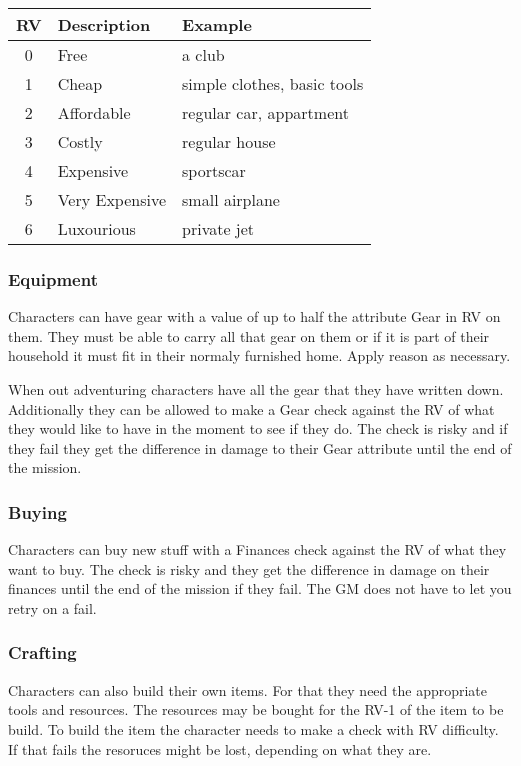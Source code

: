 \documentclass[11pt]{article}
\begin{document}
{\begin{multicols}{2}[]
\begin{center}
\begin{tabular}{c|l|l}
\textbf{RV} & \textbf{Description} & \textbf{Example}\\
\hline
0 & Free & a club\\
1 & Cheap & simple clothes, basic tools\\
2 & Affordable & regular car, appartment\\
3 & Costly & regular house\\
4 & Expensive & sportscar\\
5 & Very Expensive & small airplane\\
6 & Luxourious & private jet\\
\end{tabular}
\end{center}


\subsubsection{Equipment}
\label{sec:orgd0c9fdd}
Characters can have gear with a value of up to half the attribute Gear in RV on them. They must be able to carry all that gear on them or if it is part of their household it must fit in their normaly furnished home. Apply reason as necessary.

When out adventuring characters have all the gear that they have written down. Additionally they can be allowed to make a Gear check against the RV of what they would like to have in the moment to see if they do. The check is risky and if they fail they get the difference in damage to their Gear attribute until the end of the mission.

\subsubsection{Buying}
\label{sec:org58f7f44}
Characters can buy new stuff with a Finances check against the RV of what they want to buy. The check is risky and they get the difference in damage on their finances until the end of the mission if they fail. The GM does not have to let you retry on a fail.

\subsubsection{Crafting}
\label{sec:org90ed997}
Characters can also build their own items. For that they need the appropriate tools and resources. The resources may be bought for the RV-1 of the item to be build. To build the item the character needs to make a check with RV difficulty. If that fails the resoruces might be lost, depending on what they are.


\end{multicols}}
\end{document}
